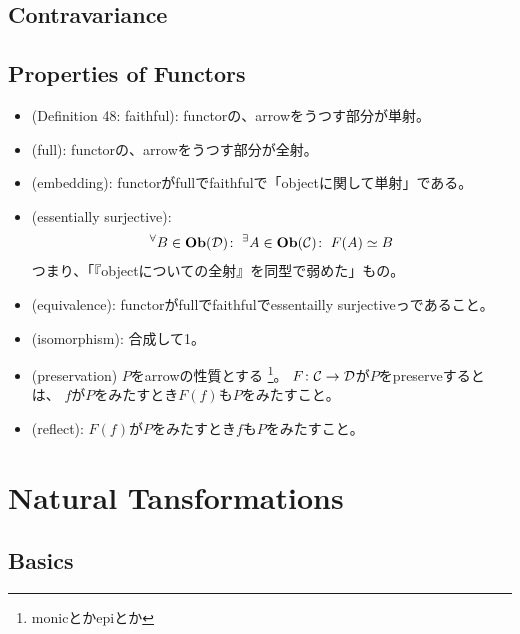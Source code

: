 \documentclass[9pt]{ltjsarticle}
\begin{document}
\subsection{Contravariance}
\label{sub:Contravariance}

\subsection{Properties of Functors}
\label{sub:Properties of Functors}
\begin{itemize}
  \item (Definition 48: faithful):
  functorの、arrowをうつす部分が単射。
  \item (full):
  functorの、arrowをうつす部分が全射。
  \item (embedding):
  functorがfullでfaithfulで「objectに関して単射」である。
  \item (essentially surjective):
  \begin{align}
    \Forall{B\in \obj(\cal D)} \Exists{A\in \obj(\cal C)} F(A) \simeq B
  \end{align}
  つまり、「『objectについての全射』を同型で弱めた」もの。
  \item (equivalence):
  functorがfullでfaithfulでessentailly surjectiveっであること。
  \item (isomorphism):
  合成して1。
  \item (preservation)
  $P$をarrowの性質とする
  \footnote{monicとかepiとか}。
  $F\colon \cal C\to \cal D$が$P$をpreserveするとは、
  $f$が$P$をみたすとき$F(f)$も$P$をみたすこと。
  \item (reflect):
  $F(f)$が$P$をみたすとき$f$も$P$をみたすこと。
\end{itemize}

\section{Natural Tansformations}
\label{sec:Natural Tansformations}
\subsection{Basics}
\label{sub:Basics}
\end{document}
